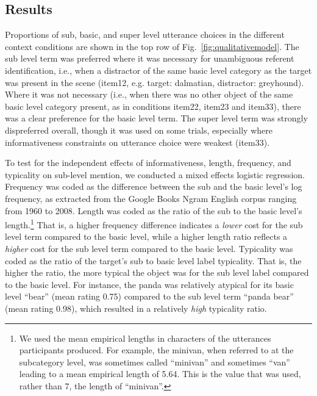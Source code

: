 \documentclass[10pt,letterpaper]{article}
\newcommand{\figref}[1]{Fig.~\ref{#1}}
\begin{document}
\subsection{\bf Results}

Proportions of sub, basic, and super level utterance choices in the different context conditions are shown in the top row of \figref{fig:qualitativemodel}. The sub level term was preferred where it was necessary for unambiguous referent identification, i.e., when a distractor of the same basic level category as the target was present in the scene (item12, e.g. target: dalmatian, distractor: greyhound). Where it was not necessary (i.e., when there was no other object of the same basic level category present, as in conditions item22, item23 and item33), there was a clear preference for the basic level term. The super level term was strongly dispreferred overall, though it was used on some trials, especially where informativeness constraints on utterance choice were weakest (item33). 
%

To test for the independent effects of informativeness, length, frequency, and typicality on sub-level mention, we conducted a mixed effects logistic regression. Frequency was coded as the difference between the sub and the basic level's log frequency, as extracted from the Google Books Ngram English corpus ranging from 1960 to 2008. Length was coded as the ratio of the sub to the basic level's length.\footnote{We used the mean empirical lengths in characters of the utterances participants produced. For example, the minivan, when referred to at the subcategory level, was sometimes called ``minivan'' and sometimes ``van'' leading to a mean empirical length of 5.64. This is the value that was used, rather than 7, the length of ``minivan''.} That is, a higher frequency difference indicates a \emph{lower} cost for the sub level term compared to the basic level, while a higher length ratio reflects a \emph{higher} cost for the sub level term compared to the basic level. Typicality was coded as the ratio of the target's sub to basic level label typicality. That is, the higher the ratio, the more typical the object was for the sub level label compared to the basic level.
For instance, the panda was relatively atypical for its basic level ``bear'' (mean rating 0.75) compared to the sub level term ``panda bear'' (mean rating 0.98), which resulted in a relatively \emph{high} typicality ratio.
\end{document}
